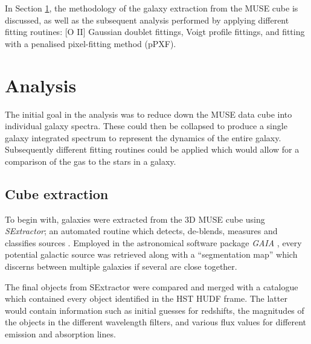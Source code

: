 \documentclass[12pt, twocolumn]{revtex4}    %
\begin{document}
In Section \ref{sec:analysis}, the methodology of the galaxy extraction from the MUSE cube is discussed, as well as the subsequent analysis performed by applying different fitting routines: [O II] Gaussian doublet fittings, Voigt profile fittings, and fitting with a penalised pixel-fitting method (pPXF). 


\section{Analysis} 
\label{sec:analysis}

The initial goal in the analysis was to reduce down the MUSE data cube into individual galaxy spectra. These could then be collapsed to produce a single galaxy integrated spectrum to represent the dynamics of the entire galaxy. Subsequently different fitting routines could be applied which would allow for a comparison of the gas to the stars in a galaxy.

\subsection{Cube extraction}

To begin with, galaxies were extracted from the 3D MUSE cube using \textit{SExtractor}; an automated routine which detects, de-blends, measures and classifies sources \citep{bertin_sextractor}. Employed in the astronomical software package \textit{GAIA} \citep{currie_starlink}, every potential galactic source was retrieved along with a ``segmentation map'' which discerns between multiple galaxies if several are close together. 

The final objects from SExtractor were compared and merged with a catalogue which contained every object identified in the HST HUDF frame. The latter would contain information such as initial guesses for redshifts, the magnitudes of the objects in the different wavelength filters, and various flux values for different emission and absorption lines.
\end{document}
